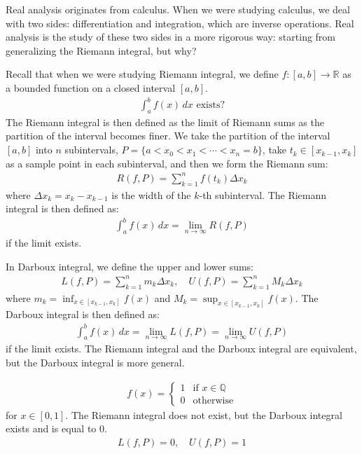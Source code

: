 Real analysis originates from calculus. When we were studying calculus, we deal with two sides:
differentiation and integration, which are inverse operations.
Real analysis is the study of these two sides in a more rigorous way: starting from generalizing the 
Riemann integral, but why?

Recall that when we were studying Riemann integral, we define 
$f: [a, b] \to \mathbb{R}$ as a bounded function on a closed interval $[a, b]$.
\begin{gather}
\int_a^b f(x) \, dx \text{ exists?}
\end{gather}
The Riemann integral is then defined as the limit of Riemann sums as the partition of the interval becomes finer.
We take the partition of the interval $[a, b]$ into $n$ subintervals,
$P = \{ a < x_0 < x_1 < \cdots < x_n = b \}$,
take $t_k \in [x_{k-1}, x_k]$ as a sample point in each subinterval,
and then we form the Riemann sum:
\begin{gather}
R(f, P) = \sum_{k=1}^n f(t_k) \Delta x_k
\end{gather}
where $\Delta x_k = x_k - x_{k-1}$ is the width of the $k$-th subinterval.
The Riemann integral is then defined as:
\begin{gather}
\int_a^b f(x) \, dx = \lim_{n \to \infty} R(f, P)
\end{gather}
if the limit exists.

In Darboux integral, we define the upper and lower sums:
\begin{gather}
L(f, P) = \sum_{k=1}^n m_k \Delta x_k, \quad U(f, P) = \sum_{k=1}^n M_k \Delta x_k
\end{gather}
where $m_k = \inf_{x \in [x_{k-1}, x_k]} f(x)$ and $M_k = \sup_{x \in [x_{k-1}, x_k]} f(x)$.
The Darboux integral is then defined as:
\begin{gather}
\int_a^b f(x) \, dx = \lim_{n \to \infty} L(f, P) = \lim_{n \to \infty} U(f, P)
\end{gather}
if the limit exists.
The Riemann integral and the Darboux integral are equivalent, but the Darboux integral is more general.

\begin{eg}
    \label{eg1}
    \begin{gather*}
        f(x) = \begin{cases}
            1 & \text{if } x \in \mathbb{Q} \\
            0 & \text{otherwise}
        \end{cases}
    \end{gather*}
    for $x \in [0,1].$
    The Riemann integral does not exist, but the Darboux integral exists and is equal to 0.
    \begin{gather*}
        L(f, P) = 0, \quad U(f, P) = 1
    \end{gather*}
\end{eg}

